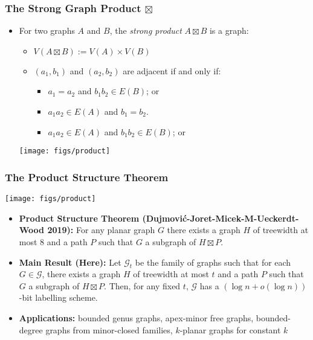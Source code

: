 \documentclass[aspectratio=169,xcolor=dvipsnames]{beamer}
\begin{document}
\begin{frame}
    \frametitle{The Strong Graph Product $\boxtimes$}

    \begin{itemize}
        \item[] For two graphs $A$ and $B$, the \emph{strong product} $A\boxtimes B$ is a graph:
        \begin{itemize}
            \item $V(A\boxtimes B):=V(A)\times V(B)$
            \item $(a_1,b_1)$ and $(a_2,b_2)$ are adjacent if and only if:
            \begin{itemize}
                \item $a_1=a_2$ and $b_1b_2\in E(B)$; or
                \item $a_1a_2 \in E(A)$ and $b_1=b_2$.
                \item  $a_1a_2 \in E(A)$ and $b_1b_2 \in E(B)$; or
            \end{itemize}
        \end{itemize}
        \begin{center}
            \texttt{[image: figs/product]}
        \end{center}
    \end{itemize}
\end{frame}


\begin{frame}
    \frametitle{The Product Structure Theorem}

    \begin{center}
        \texttt{[image: figs/product]}
    \end{center}

    \begin{itemize}
        \item<+->\textbf{Product Structure Theorem (Dujmović-Joret-Micek-M-Ueckerdt-Wood 2019):} For any planar graph $G$ there exists a graph $H$ of treewidth at most $8$ and a path $P$ such that $G$ a subgraph of $H\boxtimes P$.

        \item<+->\textbf{Main Result (Here):} Let $\mathcal{G}_t$ be the family of graphs such that for each $G\in\mathcal{G}$, there exists a graph $H$ of treewidth at most $t$ and a path $P$ such that $G$ a subgraph of $H\boxtimes P$.  Then, for any fixed $t$, $\mathcal{G}$ has a $(\log n + o(\log n))$-bit labelling scheme.

        \item<+->\textbf{Applications:} bounded genus graphs, apex-minor free graphs, bounded-degree graphs from minor-closed families, $k$-planar graphs for constant $k$
    \end{itemize}
\end{frame}
\end{document}
